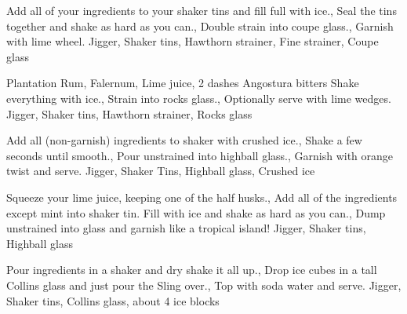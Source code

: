 \documentclass[../main.tex]{subfiles}
\begin{document}


    {
            {Add all of your ingredients to your shaker tins and fill full with ice.},
            {Seal the tins together and shake as hard as you can.},
            {Double strain into coupe glass.},
            {Garnish with lime wheel.}
    }
    {Jigger, Shaker tins, Hawthorn strainer, Fine strainer, Coupe glass}

    \cocktailDivider

    {
         Plantation Rum,
         Falernum,
         Lime juice,
        2 dashes Angostura bitters
    }
    {
            {Shake everything with ice.},
            {Strain into rocks glass.},
            {Optionally serve with lime wedges.}
    }
    {Jigger, Shaker tins, Hawthorn strainer, Rocks glass}

    \cocktailDivider

    {
            {Add all (non-garnish) ingredients to shaker with crushed ice.},
            {Shake a few seconds until smooth.},
            {Pour unstrained into highball glass.},
            {Garnish with orange twist and serve.}
    }
    {Jigger, Shaker Tins, Highball glass, Crushed ice}

    \cocktailDivider

    {
            {Squeeze your lime juice, keeping one of the half husks.},
            {Add all of the ingredients except mint into shaker tin. Fill with ice and shake as hard as you can.},
            {Dump unstrained into glass and garnish like a tropical island!}
    }
    {Jigger, Shaker tins, Highball glass}

    \clearpage

    {
            {Pour ingredients in a shaker and dry shake it all up.},
            {Drop ice cubes in a tall Collins glass and just pour the Sling over.},
            {Top with soda water and serve.}
    }
    {Jigger, Shaker tins, Collins glass, about 4 ice blocks}
\end{document}
